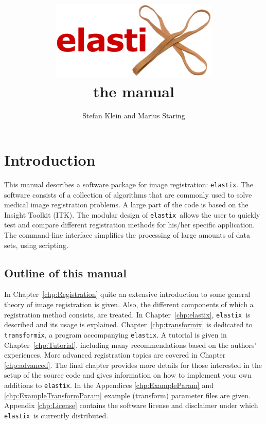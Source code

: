 \documentclass[]{report}
\newcommand{\elastix}{\texttt{elastix}}
\newcommand{\transformix}{\texttt{transformix}}
\begin{document}
\title{\includegraphics[width=8cm]{elastixLogo.eps}\\\vspace{1cm}the manual\vspace{1cm}}
\author{Stefan Klein and Marius Staring}
\maketitle

\setcounter{page}{1}  \tableofcontents
\newpage
{} \setcounter{page}{1}


\chapter{Introduction}\label{chp:Introduction}

This manual describes a software package for image registration:
\elastix. The software consists of a collection of algorithms that
are commonly used to solve medical image registration problems. A
large part of the code is based on the Insight Toolkit (ITK). The
modular design of \elastix\ allows the user to quickly test and
compare different registration methods for his/her specific
application. The command-line interface simplifies the processing
of large amounts of data sets, using scripting.

\section{Outline of this manual}

In Chapter~\ref{chp:Registration} quite an extensive introduction to
some general theory of image registration is given. Also, the
different components of which a registration method consists, are
treated. In Chapter~\ref{chp:elastix}, \elastix\ is described and
its usage is explained. Chapter~\ref{chp:transformix} is dedicated
to \transformix, a program accompanying \elastix. A tutorial is
given in Chapter~\ref{chp:Tutorial}, including many recommendations
based on the authors' experiences. More advanced registration topics
are covered in Chapter \ref{chp:advanced}. The final chapter
provides more details for those interested in the setup of the
source code and gives information on how to implement your own
additions to \elastix. In the Appendices \ref{chp:ExampleParam} and
\ref{chp:ExampleTransformParam} example (transform) parameter files
are given. Appendix \ref{chp:License} contains the software license
and disclaimer under which \elastix\ is currently distributed.
\end{document}
